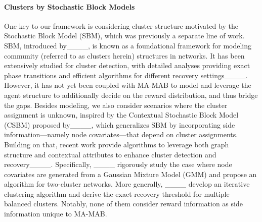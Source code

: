 \paragraph{Clusters by Stochastic Block Models} 
One key to our framework is considering cluster structure motivated by the Stochastic Block Model (SBM), which was previously a separate line of work. SBM, introduced by____, is known as a foundational framework for modeling community (referred to as clusters herein) structures in networks. It has been extensively studied for cluster detection, with detailed analyses providing exact phase transitions and efficient algorithms for different recovery settings____. However, it has not yet been coupled with MA-MAB to model and leverage the agent structure to additionally decide on the reward distribution, and thus bridge the gaps. Besides modeling, we also consider scenarios where the cluster assignment is unknown, inspired by the Contextual Stochastic Block Model (CSBM) proposed by____, which generalizes SBM by incorporating side information—namely node covariates—that depend on cluster assignments. Building on that, recent work provide algorithms to leverage both graph structure and contextual attributes to enhance cluster detection and recovery____. Specifically, ____ rigorously study the case where node covariates are generated from a Gaussian Mixture Model (GMM) and propose an algorithm for two-cluster networks. More generally, ____ develop an iterative clustering algorithm and derive the exact recovery threshold for multiple balanced clusters. Notably, none of them consider reward information as side information unique to MA-MAB. 



